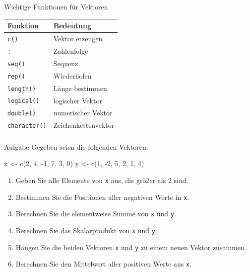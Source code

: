 \documentclass[
  10pt,
  ignorenonframetext,
  aspectratio=169,
]{beamer}
\newenvironment{Shaded}{}{}
\newcommand{\DecValTok}[1]{\textcolor[rgb]{0.25,0.63,0.44}{#1}}
\newcommand{\FunctionTok}[1]{\textcolor[rgb]{0.02,0.16,0.49}{#1}}
\newcommand{\NormalTok}[1]{#1}
\newcommand{\OtherTok}[1]{\textcolor[rgb]{0.00,0.44,0.13}{#1}}
\newcommand{\SpecialCharTok}[1]{\textcolor[rgb]{0.25,0.44,0.63}{#1}}
\providecommand{\tightlist}{%
  \setlength{\itemsep}{0pt}\setlength{\parskip}{0pt}}
\begin{document}
\begin{frame}[fragile]{Wichtige Funktionen für Vektoren}
\label{wichtige-funktionen-fuxfcr-vektoren}
\begin{longtable}[]{@{}ll@{}}
\toprule\noalign{}
Funktion & Bedeutung \\
\midrule\noalign{}
\endhead
\texttt{c()} & Vektor erzeugen \\
\texttt{:} & Zahlenfolge \\
\texttt{seq()} & Sequenz \\
\texttt{rep()} & Wiederholen \\
\texttt{length()} & Länge bestimmen \\
\texttt{logical()} & logischer Vektor \\
\texttt{double()} & numerischer Vektor \\
\texttt{character()} & Zeichenkettenvektor \\
\bottomrule\noalign{}
\end{longtable}
\end{frame}

\begin{frame}[fragile]{Aufgabe}
\label{aufgabe-3}
Gegeben seien die folgenden Vektoren:

\begin{Shaded}
\begin{Highlighting}[]
\NormalTok{x }\OtherTok{\textless{}{-}} \FunctionTok{c}\NormalTok{(}\DecValTok{2}\NormalTok{, }\DecValTok{4}\NormalTok{, }\SpecialCharTok{{-}}\DecValTok{1}\NormalTok{, }\DecValTok{7}\NormalTok{, }\DecValTok{3}\NormalTok{, }\DecValTok{0}\NormalTok{)}
\NormalTok{y }\OtherTok{\textless{}{-}} \FunctionTok{c}\NormalTok{(}\DecValTok{1}\NormalTok{, }\SpecialCharTok{{-}}\DecValTok{2}\NormalTok{, }\DecValTok{5}\NormalTok{, }\DecValTok{2}\NormalTok{, }\DecValTok{1}\NormalTok{, }\DecValTok{4}\NormalTok{)}
\end{Highlighting}
\end{Shaded}

\begin{enumerate}
\tightlist
\item
  Geben Sie alle Elemente von \texttt{x} aus, die größer als 2 sind.
\item
  Bestimmen Sie die Positionen aller negativen Werte in \texttt{x}.
\item
  Berechnen Sie die elementweise Summe von \texttt{x} und \texttt{y}.
\item
  Berechnen Sie das Skalarprodukt von \texttt{x} und \texttt{y}.
\item
  Hängen Sie die beiden Vektoren \texttt{x} und \texttt{y} zu einem
  neuen Vektor zusammen.
\item
  Berechnen Sie den Mittelwert aller positiven Werte aus \texttt{x}.
\end{enumerate}
\end{frame}

\begin{frame}
\end{frame}
\end{document}

